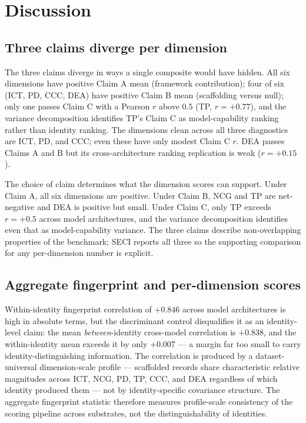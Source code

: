 \documentclass[11pt]{article}
\begin{document}
\section{Discussion}
\label{sec:discussion}

\subsection{Three claims diverge per dimension}

The three claims diverge in ways a single composite would have hidden. All six dimensions have positive Claim A mean (framework contribution); four of six (ICT, PD, CCC, DEA) have positive Claim B mean (scaffolding versus null); only one passes Claim C with a Pearson $r$ above $0.5$ (TP, $r = +0.77$), and the variance decomposition identifies TP's Claim C as model-capability ranking rather than identity ranking. The dimensions clean across all three diagnostics are ICT, PD, and CCC; even these have only modest Claim C $r$. DEA passes Claims A and B but its cross-architecture ranking replication is weak ($r = +0.15$).

The choice of claim determines what the dimension scores can support. Under Claim A, all six dimensions are positive. Under Claim B, NCG and TP are net-negative and DEA is positive but small. Under Claim C, only TP exceeds $r = +0.5$ across model architectures, and the variance decomposition identifies even that as model-capability variance. The three claims describe non-overlapping properties of the benchmark; SECI reports all three so the supporting comparison for any per-dimension number is explicit.

\subsection{Aggregate fingerprint and per-dimension scores}

Within-identity fingerprint correlation of $+0.846$ across model architectures is high in absolute terms, but the discriminant control disqualifies it as an identity-level claim: the mean \emph{between}-identity cross-model correlation is $+0.838$, and the within-identity mean exceeds it by only $+0.007$ --- a margin far too small to carry identity-distinguishing information. The correlation is produced by a dataset-universal dimension-scale profile --- scaffolded records share characteristic relative magnitudes across ICT, NCG, PD, TP, CCC, and DEA regardless of which identity produced them --- not by identity-specific covariance structure. The aggregate fingerprint statistic therefore measures profile-scale consistency of the scoring pipeline across substrates, not the distinguishability of identities.
\end{document}
